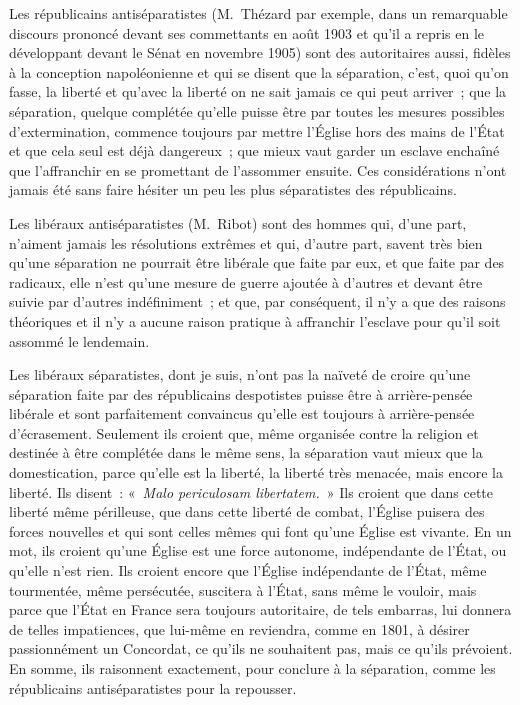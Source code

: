 \documentclass[french,twoside]{book} %
\begin{document}
Les républicains antiséparatistes (M. Thézard par exemple, dans un remarquable discours prononcé devant ses commettants en août 1903 et qu’il a repris en le développant devant le Sénat en novembre 1905) sont des autoritaires aussi, fidèles à la conception napoléonienne et qui se disent que la séparation, c’est, quoi qu’on fasse, la liberté et qu’avec la liberté on ne sait jamais ce qui peut arriver ; que la séparation, quelque complétée qu’elle puisse être par toutes les mesures possibles d’extermination, commence toujours par mettre l’Église hors des mains de l’État et que cela seul est déjà dangereux ; que mieux vaut garder un esclave enchaîné que l’affranchir en se promettant de l’assommer ensuite. Ces considérations n’ont jamais été sans faire hésiter un peu les plus séparatistes des républicains.\par
Les libéraux antiséparatistes (M. Ribot) sont des hommes qui, d’une part, n’aiment jamais les résolutions extrêmes et qui, d’autre part, savent très bien qu’une séparation ne pourrait être libérale que faite par eux, et que faite par des radicaux, elle n’est qu’une mesure de guerre ajoutée à d’autres et devant  être suivie par d’autres indéfiniment ; et que, par conséquent, il n’y a que des raisons théoriques et il n’y a aucune raison pratique à affranchir l’esclave pour qu’il soit assommé le lendemain.\par
Les libéraux séparatistes, dont je suis, n’ont pas la naïveté de croire qu’une séparation faite par des républicains despotistes puisse être à arrière-pensée libérale et sont parfaitement convaincus qu’elle est toujours à arrière-pensée d’écrasement. Seulement ils croient que, même organisée contre la religion et destinée à être complétée dans le même sens, la séparation vaut mieux que la domestication, parce qu’elle est la liberté, la liberté très menacée, mais encore la liberté. Ils disent : « {\itshape Malo periculosam libertatem.} » Ils croient que dans cette liberté même périlleuse, que dans cette liberté de combat, l’Église puisera des forces nouvelles et qui sont celles mêmes qui font qu’une Église est vivante. En un mot, ils croient qu’une Église est une force autonome, indépendante de l’État, ou qu’elle n’est rien. Ils croient encore que l’Église indépendante de l’État, même tourmentée, même persécutée, suscitera à l’État, sans même le vouloir, mais parce que l’État en France sera toujours autoritaire, de tels embarras, lui donnera de telles impatiences, que lui-même en reviendra,  comme en 1801, à désirer passionnément un Concordat, ce qu’ils ne souhaitent pas, mais ce qu’ils prévoient. En somme, ils raisonnent exactement, pour conclure à la séparation, comme les républicains antiséparatistes pour la repousser.\par
\end{document}
